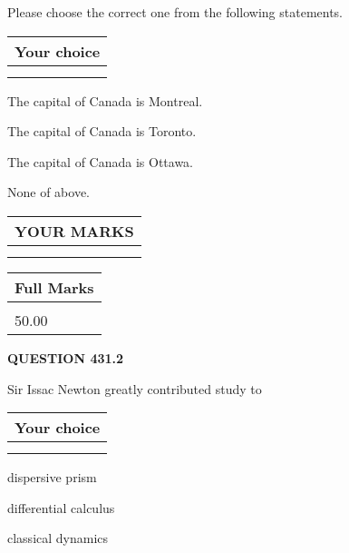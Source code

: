 \documentclass[12pt]{article}
\begin{document}
  
Please choose the correct one from the following statements.
  
  
\noindent\hspace{3.0in} \begin{tabular}{|l|}
\hline
Your choice \\
\hline
 \\ 
 \\ 
\hline
\end{tabular}
  
  
 
 
The capital of Canada is Montreal.
 
 
The capital of Canada is Toronto.
 
 
The capital of Canada is Ottawa.
 
 
 None of above.
 
 
  
\vspace{0.2in}
  
\noindent\begin{tabular}{|l|}
\hline
 YOUR MARKS  \\
\hline
 \\ 
 \\ 
\hline
\end{tabular}
\hspace{0.05in} \begin{tabular}{|l|}
\hline
 Full Marks  \\
\hline
 \\ 
50.00 \\
\hline
\end{tabular}
{\textbf{\Large{QUESTION
431.2 
}}}
  
  
Sir Issac Newton greatly contributed study to
  
  
\noindent\hspace{3.0in} \begin{tabular}{|l|}
\hline
Your choice \\
\hline
 \\ 
 \\ 
\hline
\end{tabular}
  
  
 
 
dispersive prism
 
 
differential calculus
 
 
classical dynamics
 
\end{document}
